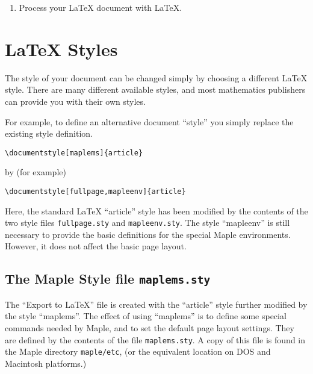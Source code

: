 {\begin{enumerate}
\begin{verbatim}
\section{An Example}
\end{verbatim}

directly into the exported document.

\item
Process your \LaTeX{} document with \LaTeX{}.

\end{enumerate}


\section{\LaTeX{} Styles}
The style of your document can be changed simply by choosing
a different \LaTeX{} style.  There are many different available
styles, and most mathematics publishers can 
provide you with their own styles.

For example, to define an alternative document ``style'' 
you simply replace the existing style definition.

\begin{verbatim}
\documentstyle[maplems]{article}
\end{verbatim}

\noindent
by (for example)

\begin{verbatim}
\documentstyle[fullpage,mapleenv]{article}
\end{verbatim}

Here, the standard \LaTeX{} ``article'' style has been modified
by the contents of the two style files  {\tt fullpage.sty} and
{\tt mapleenv.sty}.  The style ``mapleenv'' is still 
necessary to provide the basic definitions for the 
special Maple environments.  However, it does not affect the
basic page layout.

\subsection{The Maple Style file {\tt maplems.sty}}

The ``Export to \LaTeX'' file is created with the ``article'' style
further modified by the style ``maplems''.  The effect of
using ``maplems'' is to define some special
commands needed by Maple, and to set the default
page layout settings.
They are defined by the contents of the file
\verb|maplems.sty|.  A copy of this file is found in
the Maple directory   {\tt maple/etc}, (or the equivalent
location on DOS and Macintosh platforms.)

}
